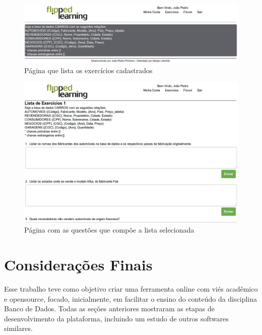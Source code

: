 \documentclass[graduacao,brazil]{ThesisPUC}
\begin{document}
\begin{figure}[H]
    \centering
    \includegraphics[width=\linewidth]{Imagens/exercise_page.png}
    \caption{P\'{a}gina que lista os exerc\'{i}cios cadastrados}
\end{figure}

\begin{figure}[H]
    \centering
    \includegraphics[width=\linewidth]{Imagens/question_page.png}
    \caption{P\'{a}gina com as quest\~{o}es que comp\~{o}e a lista selecionada}
\end{figure}


\chapter{Considera\c{c}\~{o}es Finais}

Esse trabalho teve como objetivo criar uma ferramenta online com vi\'{e}s acad\^{e}mico
e opensource, focado, inicialmente, em facilitar o ensino do conte\'{u}do da disciplina
Banco de Dados. Todas as se\c{c}\~{o}es anteriores mostraram as etapas de desenvolvimento
da plataforma, incluindo um estudo de outros softwares similares.
\end{document}
